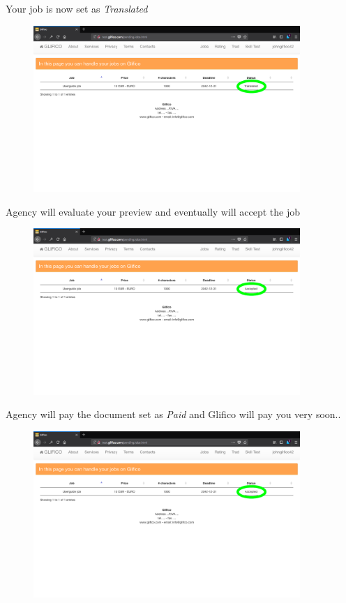 \documentclass[11 pt, a4paper]{article}
\begin{document}
\clearpage
Your job is now set as \textit{Translated}
\begin{figure}[H]
\centering
\includegraphics[width=0.9\textwidth]{translator_job10.png}
\end{figure}

Agency will evaluate your preview and eventually will accept the job
\begin{figure}[H]
\centering
\includegraphics[width=0.9\textwidth]{translator_job11.png}
\end{figure}

\clearpage
Agency will pay the document set as \textit{Paid} and Glifico will pay you very soon..
\begin{figure}[H]
\centering
\includegraphics[width=0.9\textwidth]{translator_job11.png}
\end{figure}
\end{document}
